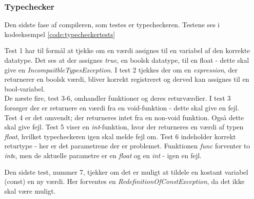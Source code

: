 \subsubsection{Typechecker}
Den sidste fase af compileren, som testes er typecheckeren. Testene ses i kodeeksempel \ref{code:typecheckertests}


\noindent Test 1 har til formål at tjekke om en værdi assignes til en variabel af den korrekte datatype. Det ses at der assignes \textit{true}, en boolsk datatype, til en float - dette skal give en \textit{IncompaitbleTypesException}.
\noindent I test 2 tjekkes der om en \textit{expression}, der returnerer en boolsk værdi, bliver korrekt registreret og derved kan assignes til en bool-variabel. \\

\noindent De næste fire, test 3-6, omhandler funktioner og deres returværdier. I test 3 forsøger der er returnere en værdi fra en void-funktion - dette skal give en fejl. Test 4 er det omvendt; der returneres intet fra en non-void funktion. Også dette skal give fejl. Test 5 viser en \textit{int}-funktion, hvor der returneres en værdi af typen \textit{float}, hvilket typecheckeren igen skal melde fejl om. Test 6 indeholder korrekt returtype - her er det parametrene der er problemet. Funktionen \textit{func} forventer to \textit{int}s, men de aktuelle parametre er en \textit{float} og en \textit{int} - igen en fejl.

\noindent Den sidste test, nummer 7,  tjekker om det er muligt at tildele en kostant variabel (const) en ny værdi. Her forventes en \textit{RedefinitionOfConstException}, da det ikke skal være muligt.